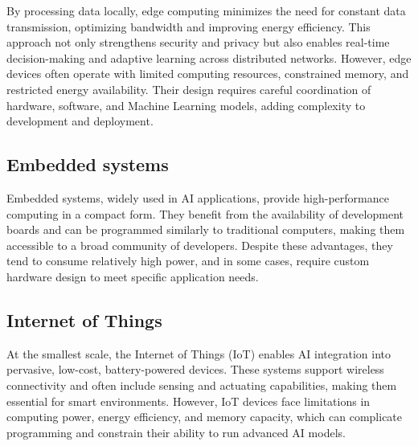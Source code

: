 By processing data locally, edge computing minimizes the need for constant data transmission, optimizing bandwidth and improving energy efficiency. 
This approach not only strengthens security and privacy but also enables real-time decision-making and adaptive learning across distributed networks. 
However, edge devices often operate with limited computing resources, constrained memory, and restricted energy availability. 
Their design requires careful coordination of hardware, software, and Machine Learning models, adding complexity to development and deployment.

\subsection{Embedded systems}
Embedded systems, widely used in AI applications, provide high-performance computing in a compact form. 
They benefit from the availability of development boards and can be programmed similarly to traditional computers, making them accessible to a broad community of developers. 
Despite these advantages, they tend to consume relatively high power, and in some cases, require custom hardware design to meet specific application needs.

\subsection{Internet of Things}
At the smallest scale, the Internet of Things (IoT) enables AI integration into pervasive, low-cost, battery-powered devices. 
These systems support wireless connectivity and often include sensing and actuating capabilities, making them essential for smart environments. 
However, IoT devices face limitations in computing power, energy efficiency, and memory capacity, which can complicate programming and constrain their ability to run advanced AI models.